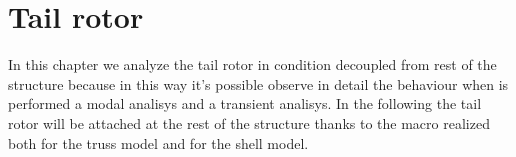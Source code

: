 \chapter{Tail rotor}
In this chapter we analyze the tail rotor in condition decoupled from rest of the structure because in this way it's possible observe in detail the behaviour when is performed a modal analisys and a transient analisys.
In the following the tail rotor will be attached at the rest of the structure thanks to  the macro realized both for the truss model and for the shell model. 